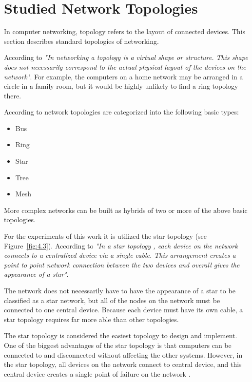 \section{Studied Network Topologies}

In computer networking, topology refers to the layout of connected devices. This
section describes standard topologies of networking.

According to \cite{topologies-intro} \textit{"In networking a topology is a
virtual shape or structure. This shape does not necessarily correspond to the
actual physical layout of the devices on the network"}. For example, the
computers on a home network may be arranged in a circle in a family room, but
it would be highly unlikely to find a ring topology there.

According to \cite{topologies-intro} network topologies are categorized into
the following basic types:

\begin{itemize}
    \item Bus
    \item Ring
    \item Star
    \item Tree
    \item Mesh
\end{itemize}

More complex networks can be built as hybrids of two or more of the above basic
topologies.

For the experiments of this work it is utilized the star topology (see
Figure~\ref{fig:4.3}). According to \cite{star-top} \textit{ "In a star topology
, each device on the network connects to a centralized device via a single
cable. This arrangement creates a point to point network connection between the
two devices and overall gives the appearance of a star"}.

The network does not necessarily have to have the appearance of a star to be
classified as a star network, but all of the nodes on the network must be
connected to one central device. Because each device must have its own cable, a
star topology requires far more able than other topologies.

The star topology is considered the easiest topology to design and implement.
One of the biggest advantages of the star topology is that computers can be
connected to and disconnected without affecting the other systems. However, in
the star topology, all devices on the network connect to  central device, and
this central device creates a single point of failure on the network
\cite{star-top}.

